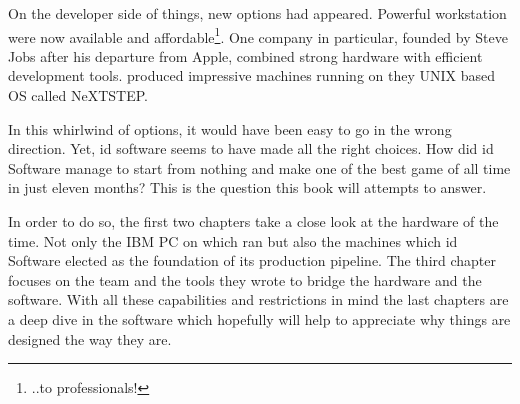  \par
 On the developer side of things, new options had appeared. Powerful workstation were now available and affordable\footnote{..to professionals!}. One company in particular, founded by Steve Jobs after his departure from Apple, combined strong hardware with efficient development tools. \NeXT produced impressive machines running on they UNIX based OS called NeXTSTEP.\\%
 \par
 In this whirlwind of options, it would have been easy to go in the wrong direction. Yet, id software seems to have made all the right choices. How did id Software manage to start from nothing and make one of the best game of all time in just eleven months? This is the question this book will attempts to answer.\\
 \par
  In order to do so, the first two chapters take a close look at the hardware of the time. Not only the IBM PC on which \doom ran but also the \NeXT machines which id Software elected as the foundation of its production pipeline. The third chapter focuses on the team and the tools they wrote to bridge the hardware and the software. With all these capabilities and restrictions in mind the last chapters are a deep dive in the software which hopefully will help to appreciate why things are designed the way they are.\\



\vspace{3pt}

